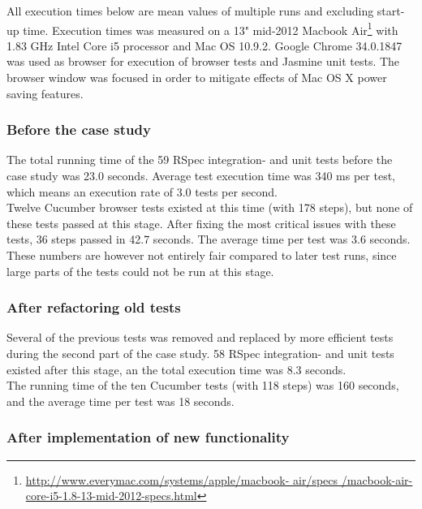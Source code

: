 
All execution times below are mean values of multiple runs and excluding
start-up time. Execution times was measured on a 13" mid-2012 Macbook
Air\footnote{\url{http://www.everymac.com/systems/apple/macbook-
air/specs /macbook-air-core-i5-1.8-13-mid-2012-specs.html}} with 1.83
GHz Intel Core i5 processor and Mac OS 10.9.2. Google Chrome 34.0.1847
was used as browser for execution of browser tests and Jasmine unit
tests. The browser window was focused in order to mitigate effects of
Mac OS X power saving features.\\

\subsubsection{Before the case study}

The total running time of the 59 RSpec integration- and unit tests
before the case study was 23.0 seconds. Average test execution time was
340 ms per test, which means an execution rate of 3.0 tests per
second.\\

Twelve Cucumber browser tests existed at this time (with 178 steps), but
none of these tests passed at this stage. After fixing the most critical
issues with these tests, 36 steps passed in 42.7 seconds. The average
time per test was 3.6 seconds. These numbers are however not entirely
fair compared to later test runs, since large parts of the tests could
not be run at this stage.\\


\subsubsection{After refactoring old tests}

Several of the previous tests was removed and replaced by more efficient
tests during the second part of the case study. 58 RSpec integration-
and unit tests existed after this stage, an the total execution time was
8.3 seconds.\\

The running time of the ten Cucumber tests (with 118 steps) was 160
seconds, and the average time per test was 18 seconds.\\


\subsubsection{After implementation of new functionality}

